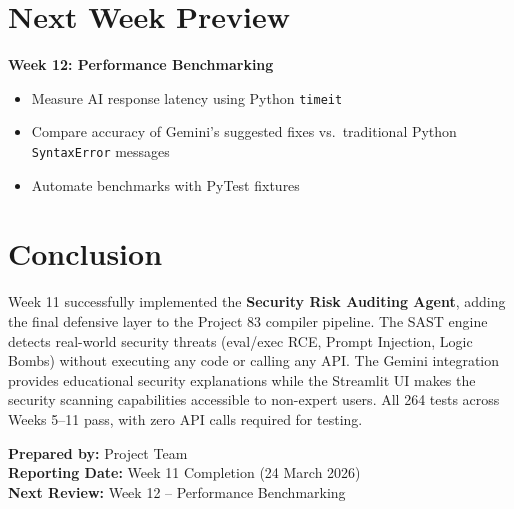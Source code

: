 \documentclass[a4paper,11pt]{article}
\begin{document}
\section{Next Week Preview}

\textbf{Week 12: Performance Benchmarking}

\begin{itemize}[leftmargin=*]
    \item Measure AI response latency using Python \texttt{timeit}
    \item Compare accuracy of Gemini's suggested fixes vs.\ traditional Python \texttt{SyntaxError} messages
    \item Automate benchmarks with PyTest fixtures
\end{itemize}

\section{Conclusion}

Week 11 successfully implemented the \textbf{Security Risk Auditing Agent}, adding the final defensive layer to the Project 83 compiler pipeline. The SAST engine detects real-world security threats (eval/exec RCE, Prompt Injection, Logic Bombs) without executing any code or calling any API. The Gemini integration provides educational security explanations while the Streamlit UI makes the security scanning capabilities accessible to non-expert users. All 264 tests across Weeks 5--11 pass, with zero API calls required for testing.

\vspace{5mm}
\noindent\textbf{Prepared by:} Project Team \\
\textbf{Reporting Date:} Week 11 Completion (24 March 2026) \\
\textbf{Next Review:} Week 12 -- Performance Benchmarking
\end{document}
